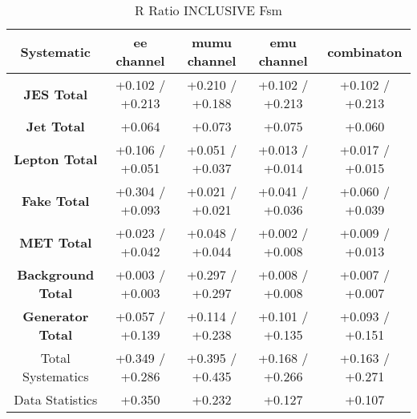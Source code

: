  \begin{table}[htbp]
\scriptsize
  \begin{center} 
  \begin{tabular}{|c|c|c|c|c|}
  \hline
   Systematic                            &  ee channel&  mumu channel&  emu channel&  combinaton\\
 \hline
\textbf{JES Total}                    &+0.102   / +0.213   & +0.210   / +0.188   & +0.102   / +0.213   & +0.102   / +0.213  \\
\textbf{Jet Total}                    &+0.064              & +0.073              & +0.075              & +0.060             \\
\textbf{Lepton Total}                 &+0.106   / +0.051   & +0.051   / +0.037   & +0.013   / +0.014   & +0.017   / +0.015  \\
\textbf{Fake Total}                   &+0.304   / +0.093   & +0.021   / +0.021   & +0.041   / +0.036   & +0.060   / +0.039  \\
\textbf{MET Total}                    &+0.023   / +0.042   & +0.048   / +0.044   & +0.002   / +0.008   & +0.009   / +0.013  \\
\textbf{Background Total}             &+0.003   / +0.003   & +0.297   / +0.297   & +0.008   / +0.008   & +0.007   / +0.007  \\
\textbf{Generator Total}              &+0.057   / +0.139   & +0.114   / +0.238   & +0.101   / +0.135   & +0.093   / +0.151  \\
  \hline
  \hline
Total Systematics                     &+0.349   / +0.286   & +0.395   / +0.435   & +0.168   / +0.266   & +0.163   / +0.271  \\
Data Statistics                       &+0.350              & +0.232              & +0.127              & +0.107             \\
  \hline
  \end{tabular}
  \end{center} 
  \label{tab:fsm_nominal_rratio}
  \caption{R Ratio INCLUSIVE Fsm}
\end{table}

